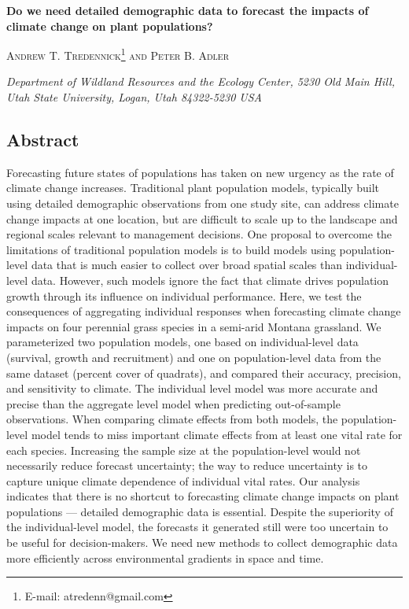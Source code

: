 \documentclass[12pt,]{article}
\author{}
\date{}
\begin{document}
\normalsize


\begin{centering}
\textbf{\large{Do we need detailed demographic data to forecast the impacts of climate change on plant populations?}}

\textsc{\small{Andrew T. Tredennick\footnote{E-mail: atredenn@gmail.com} and Peter B. Adler}}

\textit{\small{Department of Wildland Resources and the Ecology Center, 5230 Old Main Hill, Utah State University, Logan, Utah 84322-5230 USA}}

\end{centering}

\subsection{Abstract}\label{abstract}

Forecasting future states of populations has taken on new urgency as the
rate of climate change increases. Traditional plant population models,
typically built using detailed demographic observations from one study
site, can address climate change impacts at one location, but are
difficult to scale up to the landscape and regional scales relevant to
management decisions. One proposal to overcome the limitations of
traditional population models is to build models using population-level
data that is much easier to collect over broad spatial scales than
individual-level data. However, such models ignore the fact that climate
drives population growth through its influence on individual
performance. Here, we test the consequences of aggregating individual
responses when forecasting climate change impacts on four perennial
grass species in a semi-arid Montana grassland. We parameterized two
population models, one based on individual-level data (survival, growth
and recruitment) and one on population-level data from the same dataset
(percent cover of quadrats), and compared their accuracy, precision, and
sensitivity to climate. The individual level model was more accurate and
precise than the aggregate level model when predicting out-of-sample
observations. When comparing climate effects from both models, the
population-level model tends to miss important climate effects from at
least one vital rate for each species. Increasing the sample size at the
population-level would not necessarily reduce forecast uncertainty; the
way to reduce uncertainty is to capture unique climate dependence of
individual vital rates. Our analysis indicates that there is no shortcut
to forecasting climate change impacts on plant populations --- detailed
demographic data is essential. Despite the superiority of the
individual-level model, the forecasts it generated still were too
uncertain to be useful for decision-makers. We need new methods to
collect demographic data more efficiently across environmental gradients
in space and time.
\end{document}
